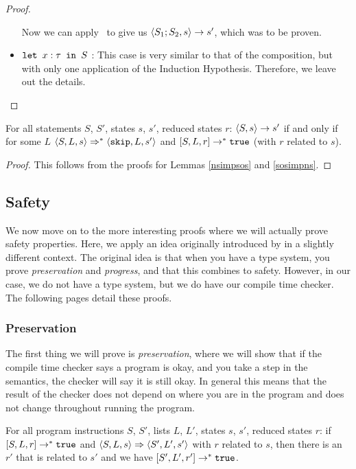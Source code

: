 \begin{proof}
\begin{itemize}[noitemsep]
Now we can apply \compns ~to give us $\langle S_1; S_2, s \rangle \to s'$, which was to be proven. 
\item $\texttt{let }x : \tau \texttt{ in } S$ : This case is very similar to that of the composition, but with only one application of the Induction Hypothesis. Therefore, we leave out the details. 
\end{itemize}
\end{proof}

\begin{theorem}
For all statements $S$, $S'$, states $s$, $s'$, reduced states $r$: $\langle S, s \rangle \to s'$ if and only if for some $L$ $\langle S, L, s \rangle \Rightarrow ^{*} \langle \texttt{skip}, L, s' \rangle$ and $[ S, L, r ] \to^{*} \texttt{true}$ (with $r$ related to $s$).
\end{theorem}

\begin{proof}
This follows from the proofs for Lemmas \ref{nsimpsos} and \ref{sosimpns}.
\end{proof}

\subsection{Safety}
We now move on to the more interesting proofs where we will actually prove safety properties. Here, we apply an idea originally introduced by \cite{wright1994syntactic} in a slightly different context. The original idea is that when you have a type system, you prove \emph{preservation} and \emph{progress}, and that this combines to safety. However, in our case, we do not have a type system, but we do have our compile time checker. The following pages detail these proofs.

\subsubsection*{Preservation}
The first thing we will prove is \emph{preservation}, where we will show that if the compile time checker says a program is okay, and you take a step in the semantics, the checker will say it is still okay. In general this means that the result of the checker does not depend on where you are in the program and does not change throughout running the program. 

\begin{theorem}
\label{preservation}
For all program instructions $S$, $S'$, lists $L$, $L'$, states $s$, $s'$, reduced states $r$: if $[ S, L, r ] \to ^* \texttt{true}$ and $\langle S, L, s \rangle \Rightarrow \langle S', L', s' \rangle$ with $r$ related to $s$, then there is an $r'$ that is related to $s'$ and we have $[ S', L', r' ] \to ^* \texttt{true}$.
\end{theorem}

